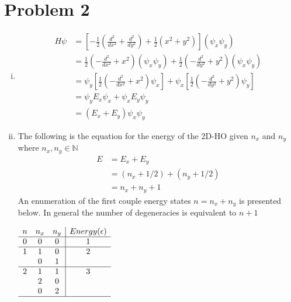\documentclass{article}
\begin{document}
\begin{enumerate}[i.]
\end{enumerate}


\section*{Problem 2}
\begin{enumerate}[i.]
  \item 
    \begin{align*}
      H\psi &= \left[ -\frac{1}{2} \left(  \frac{d^2}{dx^2} + \frac{d^2}{dy^2} \right) + \frac{1}{2} (x^2 + y^2) \right] \left( \psi_x \psi_y \right) \\
      &= \frac{1}{2} \left(  -\frac{d^2}{dx^2} + x^2 \right) \left( \psi_x \psi_y \right) + \frac{1}{2} \left(  -\frac{d^2}{dy^2} + y^2 \right) \left( \psi_x \psi_y \right) \\
      &= \psi_y \left[  \frac{1}{2} \left(  -\frac{d^2}{dx^2} + x^2\right) \psi_x \right] + \psi_x \left[  \frac{1}{2} \left(  -\frac{d^2}{dy^2} + y^2\right) \psi_y \right] \\
      &= \psi_y E_x \psi_x + \psi_x E_y \psi_y \\
      &= \left( E_x + E_y \right) \psi_x \psi_y
    \end{align*}

  \item The following is the equation for the energy of the 2D-HO given $n_x$ and $n_y$ where $n_x , n_y \in \mathbb{N}$
    \begin{align*}
      E &= E_x + E_y \\
      &= (n_x + 1/2) + (n_y + 1/2) \\
      &= n_x + n_y + 1
    \end{align*}
    An enumeration of the first couple energy states $n=n_x + n_y$ is presented below. In general the number of degeneracies is equivalent to $n+1$

    \begin{center}
    $\begin{array}{ccc|c}
      n & n_x & n_y & Energy (\epsilon)  \\ \hline
      0 & 0 & 0 & 1 \\ \hline
      1 & 1 & 0 & 2 \\
        & 0 & 1 &   \\ \hline
      2 & 1 & 1 & 3 \\
        & 2 & 0 &   \\
        & 0 & 2 &   \\ \hline
    \end{array}$\\
    \end{center}    
\end{enumerate}
\end{document}
